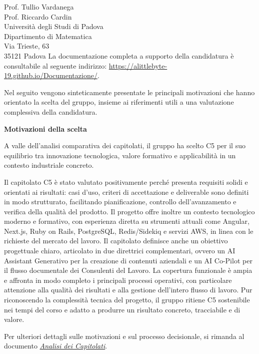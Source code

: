 \documentclass[a4paper,11pt]{letter}
\begin{document}
\begin{letter}{Prof. Tullio Vardanega\\Prof. Riccardo Cardin\\Università degli Studi di Padova\\Dipartimento di Matematica\\Via Trieste, 63\\35121 Padova}
    La documentazione completa a supporto della candidatura è consultabile al
    seguente indirizzo: \href{https://alittlebyte-19.github.io/Documentazione/}{https://alittlebyte-19.github.io/Documentazione/}.


    Nel seguito vengono sinteticamente presentate le principali motivazioni che
    hanno orientato la scelta del gruppo, insieme ai riferimenti utili a una
    valutazione complessiva della candidatura.

  \vspace{0.8em}

  \textbf{Motivazioni della scelta}

    A valle dell'analisi comparativa dei capitolati, il gruppo ha scelto C5
    per il suo equilibrio tra innovazione tecnologica, valore formativo e
    applicabilità in un contesto industriale concreto.

  Il capitolato C5 è stato valutato positivamente perché presenta requisiti
  solidi e orientati ai risultati: casi d'uso, criteri di accettazione e
  deliverable sono definiti in modo strutturato, facilitando pianificazione,
  controllo dell'avanzamento e verifica della qualità del prodotto. Il progetto
  offre inoltre un contesto tecnologico moderno e formativo, con esperienza
  diretta su strumenti attuali come Angular, Next.js, Ruby on Rails,
  PostgreSQL, Redis/Sidekiq e servizi AWS, in linea con le richieste del
  mercato del lavoro. Il capitolato definisce anche un obiettivo progettuale
  chiaro,
  articolato in due direttrici complementari, ovvero un AI Assistant Generativo
  per la creazione di contenuti aziendali e un AI Co-Pilot per il flusso
  documentale dei Consulenti del Lavoro. La copertura funzionale è ampia e
  affronta in modo completo i principali processi operativi, con particolare
  attenzione alla qualità dei risultati e alla gestione dell'intero flusso di
  lavoro. Pur riconoscendo la
  complessità tecnica del progetto, il gruppo ritiene C5 sostenibile nei tempi
  del corso e adatto a produrre un risultato concreto, tracciabile e di valore.

  \vspace{0.8em}

    Per ulteriori dettagli sulle motivazioni e sul processo decisionale,
    si rimanda al documento \href{https://alittlebyte-19.github.io/Documentazione/candidatura/analisi%20capitolati/Analisi%20dei%20Capitolati.pdf}{\textit{Analisi dei Capitolati}}.

  \vspace{1em}


\end{letter}
\end{document}
